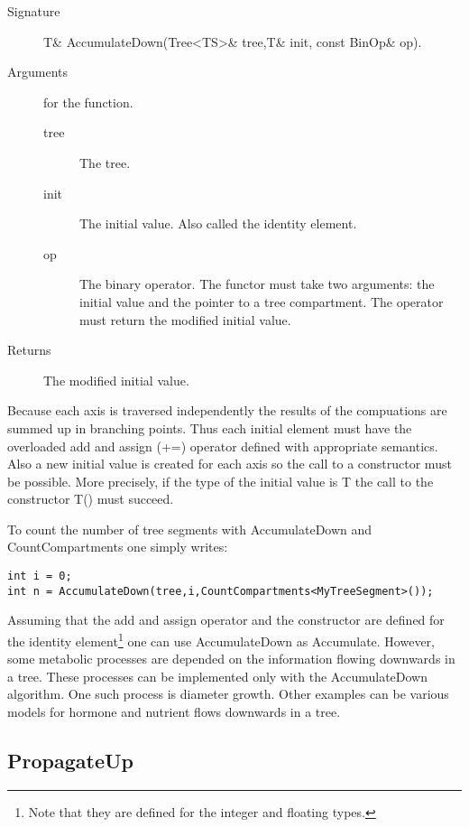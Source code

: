 \begin{description}
   \item [Signature] T\& AccumulateDown(Tree<TS>\& tree,T\& init, const BinOp\& op).
   \item [Arguments] for the function.
     \begin{description}
        \item [tree] The tree.
        \item [init] The initial value. Also called the identity
     element.
        \item [op] The binary operator. The functor must take two
     arguments: the initial value and the pointer to a tree compartment. The
     operator must return the modified initial value.
     \end{description} 
   \item[Returns] The  modified initial value.
\end{description} 

Because  each axis is   traversed   independently the results of   the
compuations  are  summed up in  branching   points.  Thus each initial
element must have the overloaded add and  assign (+=) operator defined
with  appropriate semantics. Also a  new initial  value is created for
each  axis  so  the call to   a  constructor  must  be  possible. More
precisely, if  the type of   the initial value  is  T the call to  the
constructor T() must succeed.

To  count  the   number of   tree  segments  with  AccumulateDown  and
CountCompartments one simply writes:

\begin{verbatim}
int i = 0;
int n = AccumulateDown(tree,i,CountCompartments<MyTreeSegment>());
\end{verbatim}

Assuming  that the  add and  assign operator  and the  constructor are
defined for  the identity element\footnote{Note that  they are defined
for  the integer  and floating  types.} one  can use  AccumulateDown as
Accumulate.   However, some  metabolic processes  are depended  on the
information  flowing downwards  in  a tree.   These  processes can  be
implemented only with the  AccumulateDown algorithm.  One such process
is diameter growth.  Other examples  can be various models for hormone
and nutrient flows downwards in a tree.

\subsection{PropagateUp}

